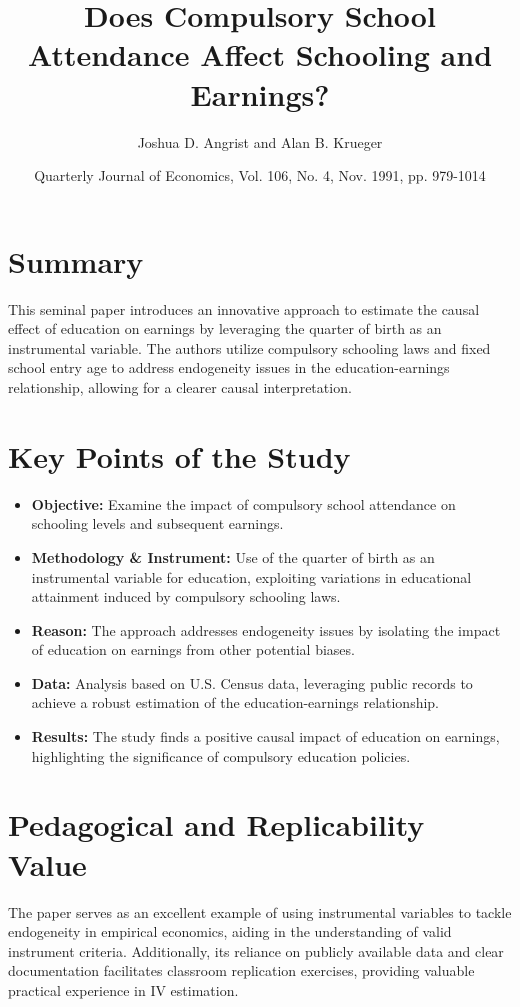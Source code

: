 \documentclass{article}
\begin{document}
\title{Does Compulsory School Attendance Affect Schooling and Earnings?}
\author{Joshua D. Angrist and Alan B. Krueger}
\date{Quarterly Journal of Economics, Vol. 106, No. 4, Nov. 1991, pp. 979-1014}

\maketitle

\section*{Summary}
This seminal paper introduces an innovative approach to estimate the causal effect of education on earnings by leveraging the quarter of birth as an instrumental variable. The authors utilize compulsory schooling laws and fixed school entry age to address endogeneity issues in the education-earnings relationship, allowing for a clearer causal interpretation.

\section*{Key Points of the Study}

\begin{itemize} \scriptsize
\item \textbf{Objective:} Examine the impact of compulsory school attendance on schooling levels and subsequent earnings.
\item \textbf{Methodology \& Instrument:} Use of the quarter of birth as an instrumental variable for education, exploiting variations in educational attainment induced by compulsory schooling laws.
\item \textbf{Reason:} The approach addresses endogeneity issues by isolating the impact of education on earnings from other potential biases.
\item \textbf{Data:} Analysis based on U.S. Census data, leveraging public records to achieve a robust estimation of the education-earnings relationship.
\item \textbf{Results:} The study finds a positive causal impact of education on earnings, highlighting the significance of compulsory education policies.
\end{itemize}

\section*{Pedagogical and Replicability Value}
The paper serves as an excellent example of using instrumental variables to tackle endogeneity in empirical economics, aiding in the understanding of valid instrument criteria. Additionally, its reliance on publicly available data and clear documentation facilitates classroom replication exercises, providing valuable practical experience in IV estimation.
\end{document}
